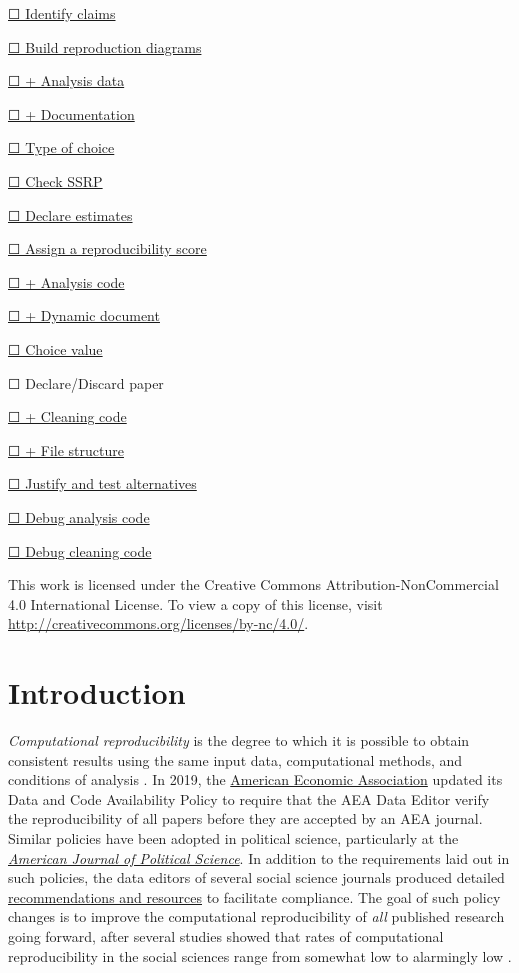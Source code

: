 \documentclass[
]{book}
\begin{document}
\protect\hyperlink{declare-estimates}{☐ Identify claims}

\protect\hyperlink{diagram}{☐ Build reproduction diagrams}

\protect\hyperlink{ad}{☐ + Analysis data}

\protect\hyperlink{paper-level}{☐ + Documentation}

\protect\hyperlink{id-type}{☐ Type of choice}

\protect\hyperlink{check-acre}{☐ Check SSRP}

\protect\hyperlink{declare-estimates}{☐ Declare estimates}

\protect\hyperlink{score}{☐ Assign a reproducibility score}

\protect\hyperlink{ac}{☐ + Analysis code}

\protect\hyperlink{paper-level}{☐ + Dynamic document}

\protect\hyperlink{id-val}{☐ Choice value}

☐ Declare/Discard paper

\protect\hyperlink{cc}{☐ + Cleaning code}

\protect\hyperlink{paper-level}{☐ + File structure}

\protect\hyperlink{test-rob}{☐ Justify and test alternatives}

\protect\hyperlink{dac}{☐ Debug analysis code}

\protect\hyperlink{dcc}{☐ Debug cleaning code}

This work is licensed under the Creative Commons Attribution-NonCommercial 4.0 International License. To view a copy of this license, visit \url{http://creativecommons.org/licenses/by-nc/4.0/}.

\hypertarget{intro}{%
\chapter*{Introduction}\label{intro}}

\emph{Computational reproducibility} is the degree to which it is possible to obtain consistent results using the same input data, computational methods, and conditions of analysis \citep{national2019reproducibility}. In 2019, the \href{https://www.aeaweb.org/journals/policies/data-code/}{American Economic Association} updated its Data and Code Availability Policy to require that the AEA Data Editor verify the reproducibility of all papers before they are accepted by an AEA journal. Similar policies have been adopted in political science, particularly at the \href{https://ajps.org/ajps-verification-policy/}{\emph{American Journal of Political Science}}. In addition to the requirements laid out in such policies, the data editors of several social science journals produced detailed \href{https://social-science-data-editors.github.io/guidance/}{recommendations and resources} to facilitate compliance. The goal of such policy changes is to improve the computational reproducibility of \emph{all} published research going forward, after several studies showed that rates of computational reproducibility in the social sciences range from somewhat low to alarmingly low \citep{galiani2018make, chang2015economics, kingi2018reproducibility}.
\end{document}
